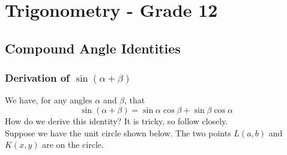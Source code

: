 \chapter{Trigonometry - Grade 12}
\label{m:t12}

\section{Compound Angle Identities}

\subsection{Derivation of $\sin(\alpha + \beta)$}
We have, for any angles $\alpha$ and $\beta$, that
$$\sin(\alpha+\beta)=\sin\alpha\cos\beta+\sin\beta\cos\alpha$$
How do we derive this identity? It is tricky, so follow closely.\\

Suppose we have the unit circle shown below. The two points $L(a,b)$ and $K(x,y)$ are on the circle.

